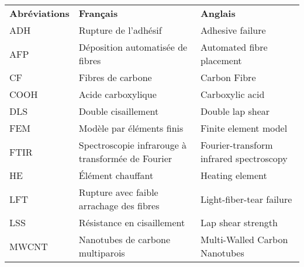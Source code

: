 \begin{longtable}{p{1in}>{\raggedright\arraybackslash}p{2.5in} p{2.45in}}
	\textbf{Abréviations} & \textbf{Français}                                                     & \textbf{Anglais}                                                         \\
	ADH                   & Rupture de l'adhésif                                                  & Adhesive failure                                                         \\
	AFP                   & Déposition automatisée de fibres                                      & Automated fibre placement                                                \\
	CF                    & Fibres de carbone                                                     & Carbon Fibre                                                             \\
	COOH                  & Acide carboxylique                                                    & Carboxylic acid                                                          \\
	DLS                   & Double cisaillement                                                   & Double lap shear                                                         \\
	FEM                   & Modèle par éléments finis                                             & Finite element model                                                     \\
	FTIR                  & Spectroscopie infrarouge à transformée de Fourier                     & Fourier-transform infrared spectroscopy                                  \\
	HE                    & Élément chauffant                                                     & Heating element                                                          \\
	LFT                   & Rupture avec faible arrachage des fibres                              & Light-fiber-tear failure                                                 \\
	LSS                   & Résistance en cisaillement                                            & Lap shear strength                                                       \\
	MWCNT                 & Nanotubes de carbone multiparois                                      & Multi-Walled Carbon Nanotubes                                            \\

\end{longtable}
